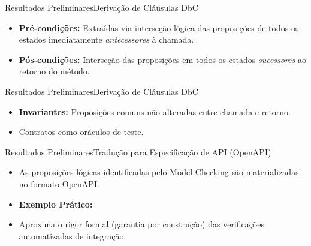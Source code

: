 \documentclass[10pt]{beamer}
\begin{document}
\begin{frame}{Resultados Preliminares}{Derivação de Cláusulas DbC}
  \begin{itemize}
    \item \textbf{Pré-condições:} Extraídas via interseção lógica das proposições de todos os estados imediatamente \textit{antecessores} à chamada.
    \begin{figure}[hb]
	    \resizebox{0.3\textwidth}{!}{
        
      }
    \end{figure}
    \item \textbf{Pós-condições:} Interseção das proposições em todos os estados \textit{sucessores} ao retorno do método.
    \begin{figure}[hb]
	    \resizebox{0.3\textwidth}{!}{
        
      }
    \end{figure}
  \end{itemize}
\end{frame}
\begin{frame}{Resultados Preliminares}{Derivação de Cláusulas DbC}
  \begin{itemize}
    \item \textbf{Invariantes:} Proposições comuns não alteradas entre chamada e retorno.
    \begin{figure}[hb]
	    \resizebox{0.6\textwidth}{!}{
        
      }
    \end{figure}
    \item Contratos como oráculos de teste.
    \begin{figure}[hb]
	    \resizebox{\textwidth}{!}{
        
      }
    \end{figure}
  \end{itemize}
\end{frame}


\begin{frame}{Resultados Preliminares}{Tradução para Especificação de API (OpenAPI)}
  \begin{itemize}
    \item As proposições lógicas identificadas pelo Model Checking são materializadas no formato OpenAPI.
    \item \textbf{Exemplo Prático:}
    \begin{figure}[hb]
	    \resizebox{\textwidth}{!}{
        
      }
    \end{figure}
    \item Aproxima o rigor formal (garantia por construção) das verificações automatizadas de integração.
  \end{itemize}
\end{frame}
\end{document}
